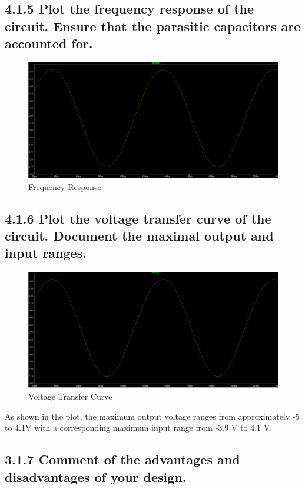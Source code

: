 \documentclass[12pt]{article}
\begin{document}
\subsection*{4.1.5 Plot the frequency response of the circuit. Ensure that the parasitic capacitors are accounted for.}

\begin{figure}[H]
    \centering
    \includegraphics[width=1.0\textwidth]{414.png}
    \caption{Frequency Response}
\end{figure}

\subsection*{4.1.6 Plot the voltage transfer curve of the circuit. Document the maximal output and input ranges.}

\begin{figure}[H]
    \centering
    \includegraphics[width=1.0\textwidth]{414.png}
    \caption{Voltage Transfer Curve}
\end{figure}

As shown in the plot, the maximum output voltage 
ranges from approximately -5 to 4.1V with a corresponding
maximum input range from -3.9 V to 4.1 V.

\subsection*{3.1.7 Comment of the advantages and disadvantages of your design.}
\end{document}
